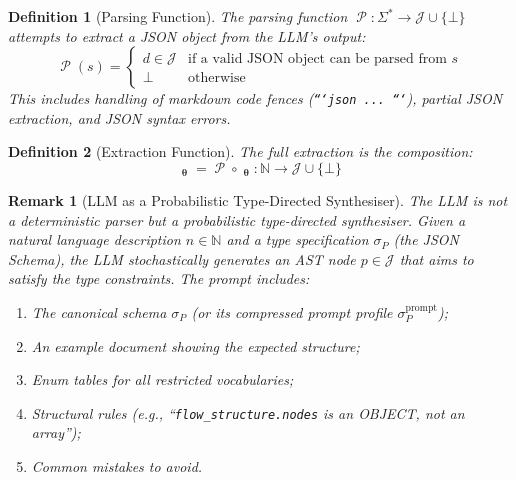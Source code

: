 \documentclass[11pt,a4paper]{article}
\newtheorem{definition}{Definition}[section]
\newtheorem{remark}{Remark}[section]
\theoremstyle{definition}
\DeclareMathOperator{\ExtractLLM}{\mathcal{E}_{\bm\theta}}
\DeclareMathOperator{\ExtractRaw}{\mathcal{E}^{\text{raw}}_{\bm\theta}}
\DeclareMathOperator{\ParseLLM}{\mathcal{P}}
\newcommand{\nspace}{\mathbb{N}}
\newcommand{\jspace}{\mathcal{J}}
\begin{document}
\begin{definition}[Parsing Function]
The parsing function $\ParseLLM : \Sigma^* \to \jspace \cup \{\bot\}$ attempts to extract a JSON object from the LLM's output:
\begin{equation}
\ParseLLM(s) =
\begin{cases}
d \in \jspace & \text{if a valid JSON object can be parsed from } s \\
\bot & \text{otherwise}
\end{cases}
\end{equation}
This includes handling of markdown code fences (\texttt{```json ... ```}), partial JSON extraction, and JSON syntax errors.
\end{definition}

\begin{definition}[Extraction Function]
The full extraction is the composition:
\begin{equation}
\ExtractLLM_{\bm\theta} = \ParseLLM \circ \ExtractRaw_{\bm\theta} : \nspace \to \jspace \cup \{\bot\}
\end{equation}
\end{definition}

\begin{remark}[LLM as a Probabilistic Type-Directed Synthesiser]
The LLM is not a deterministic parser but a \emph{probabilistic type-directed synthesiser}. Given a natural language description $n \in \nspace$ and a type specification $\sigma_P$ (the JSON Schema), the LLM stochastically generates an AST node $p \in \jspace$ that aims to satisfy the type constraints. The prompt includes:
\begin{enumerate}[label=(\roman*),leftmargin=*]
    \item The canonical schema $\sigma_P$ (or its compressed prompt profile $\sigma_P^{\text{prompt}}$);
    \item An example document showing the expected structure;
    \item Enum tables for all restricted vocabularies;
    \item Structural rules (e.g., ``\texttt{flow\_structure.nodes} is an OBJECT, not an array'');
    \item Common mistakes to avoid.
\end{enumerate}
\end{remark}
\end{document}
